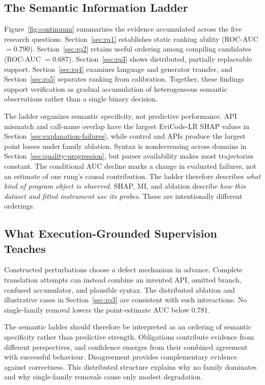 \documentclass[conference]{IEEEtran}
\begin{document}
\subsection{The Semantic Information Ladder}
Figure~\ref{fig:continuum} summarizes the evidence accumulated across the five research questions. Section~\ref{sec:rq1} establishes static ranking ability (ROC-AUC $=0.790$). Section~\ref{sec:rq2} retains useful ordering among compiling candidates (ROC-AUC $=0.687$). Section~\ref{sec:rq3} shows distributed, partially replaceable support. Section~\ref{sec:rq4} examines language and generator transfer, and Section~\ref{sec:rq5} separates ranking from calibration. Together, these findings support verification as gradual accumulation of heterogeneous semantic observations rather than a single binary decision.

The ladder organizes semantic specificity, not predictive performance. API mismatch and call-name overlap have the largest EviCode-LR SHAP values in Section~\ref{sec:explanation-failures}, while control and APIs produce the largest point losses under family ablation. Syntax is nondecreasing across domains in Section~\ref{sec:quality-progression}, but parser availability makes most trajectories constant. The conditional AUC decline marks a change in evaluated failures, not an estimate of one rung's causal contribution. The ladder therefore describes \emph{what kind of program object is observed}. SHAP, MI, and ablation describe \emph{how this dataset and fitted instrument use its probes}. These are intentionally different orderings.

\subsection{What Execution-Grounded Supervision Teaches}
Constructed perturbations choose a defect mechanism in advance. Complete translation attempts can instead combine an invented API, omitted branch, confused accumulator, and plausible syntax. The distributed ablation and illustrative cases in Section~\ref{sec:rq3} are consistent with such interactions. No single-family removal lowers the point-estimate AUC below 0.781.

The semantic ladder should therefore be interpreted as an ordering of semantic specificity rather than predictive strength. Obligations contribute evidence from different perspectives, and confidence emerges from their combined agreement with successful behaviour. Disagreement provides complementary evidence against correctness. This distributed structure explains why no family dominates and why single-family removals cause only modest degradation.
\end{document}
